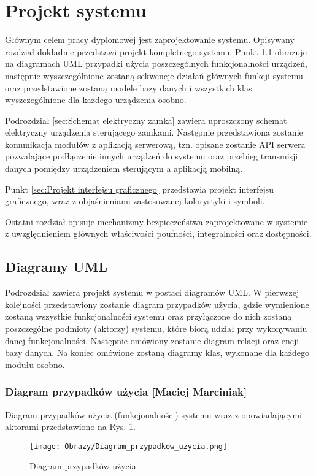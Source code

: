 % 
\newpage\section{Projekt systemu \textsl{\NazwaSys}}\label{sec:projekt}
Głównym celem pracy dyplomowej jest zaprojektowanie systemu. Opisywany rozdział dokładnie przedstawi projekt kompletnego systemu. Punkt \ref{sec:Diagramy UML} obrazuje na diagramach UML przypadki użycia poszczególnych funkcjonalności urządzeń, następnie wyszczególnione zostaną sekwencje działań głównych funkcji systemu oraz przedstawione zostaną modele bazy danych i wszystkich klas wyszczególnione dla każdego urządzenia osobno. 

Podrozdział \ref{sec:Schemat elektryczny zamka} zawiera uproszczony schemat elektryczny urządzenia sterującego zamkami. Następnie przedstawiona zostanie komunikacja modułów z aplikacją serwerową, tzn. opisane zostanie API serwera pozwalające podłączenie innych urządzeń do systemu oraz przebieg transmisji danych pomiędzy urządzeniem sterującym a aplikacją mobilną.

Punkt \ref{sec:Projekt interfejsu graficznego} przedstawia projekt interfejsu graficznego, wraz z objaśnieniami zastosowanej kolorystyki i symboli.

Ostatni rozdział opisuje mechanizmy bezpieczeństwa zaprojektowane w systemie z uwzględnieniem głównych właściwości poufności, integralności oraz dostępności.

\subsection{Diagramy UML}\label{sec:Diagramy UML}
Podrozdział zawiera projekt systemu w postaci diagramów UML. W pierwszej kolejności przedstawiony zostanie diagram przypadków użycia, gdzie wymienione zostaną wszystkie funkcjonalności systemu oraz przyłączone do nich zostaną poszczególne podmioty (aktorzy) systemu, które biorą udział przy wykonywaniu danej funkcjonalności. Następnie omówiony zostanie diagram relacji oraz encji bazy danych. Na koniec omówione zostaną diagramy klas, wykonane dla każdego modułu osobno. 
	\subsubsection{Diagram przypadków użycia [Maciej Marciniak]}
	Diagram przypadków użycia (funkcjonalności) systemu wraz z opowiadającymi aktorami przedstawiono na Rys. \ref{diagram:diagram przypadków_użycia}.
	\begin{landscape}
		\begin{figure}[!h]
			\centering
			\texttt{[image: Obrazy/Diagram\_przypadkow\_uzycia.png]}
			\caption{Diagram przypadków użycia}
			\label{diagram:diagram przypadków_użycia}
		\end{figure}
	\end{landscape}
\newpage
